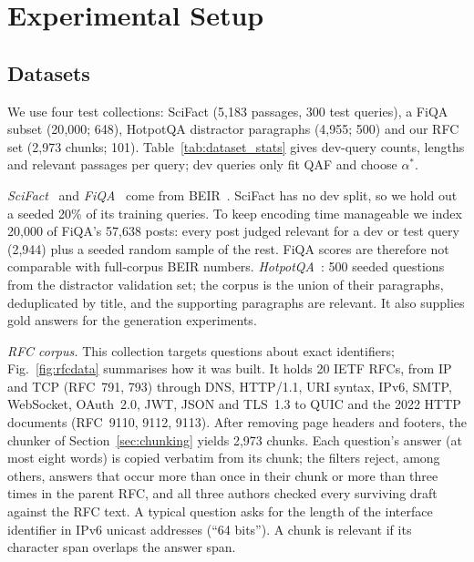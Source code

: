 \section{Experimental Setup}
\label{sec:setup}

\subsection{Datasets}
\label{sec:data}
We use four test collections: SciFact (5{,}183 passages, 300 test queries),
a FiQA subset (20{,}000; 648), HotpotQA distractor paragraphs (4{,}955; 500)
and our RFC set (2{,}973 chunks; 101). Table~\ref{tab:dataset_stats} gives
dev-query counts, lengths and relevant passages per query; dev queries only
fit QAF and choose $\alpha^{*}$.

\textit{SciFact}~\cite{wadden2020scifact} and \textit{FiQA}~\cite{maia2018fiqa}
come from BEIR~\cite{thakur2021beir}. SciFact has no dev split, so we hold out
a seeded 20\% of its training queries. To keep encoding time manageable we
index 20{,}000 of FiQA's 57{,}638 posts: every post judged relevant for a dev
or test query (2{,}944) plus a seeded random sample of the rest. FiQA scores
are therefore not comparable with full-corpus BEIR numbers.
\textit{HotpotQA}~\cite{yang2018hotpotqa}: 500 seeded questions from the
distractor validation set; the corpus is the union of their paragraphs,
deduplicated by title, and the supporting paragraphs are relevant. It also
supplies gold answers for the generation experiments.

\textit{RFC corpus.} This collection targets questions about exact
identifiers; Fig.~\ref{fig:rfcdata} summarises how it was built. It holds 20 IETF
RFCs, from IP and TCP (RFC~791, 793) through DNS, HTTP/1.1, URI syntax, IPv6,
SMTP, WebSocket, OAuth~2.0, JWT, JSON and TLS~1.3 to QUIC and the 2022 HTTP
documents (RFC~9110, 9112, 9113). After removing page headers and footers, the
chunker of Section~\ref{sec:chunking} yields 2{,}973 chunks. Each question's
answer (at most eight words) is copied verbatim from its chunk; the filters
reject, among others, answers that occur more than once in their chunk or more
than three times in the parent RFC, and all three authors checked every
surviving draft against the RFC text. A typical question asks for the length
of the interface identifier in IPv6 unicast addresses (``64 bits''). A chunk
is relevant if its character span overlaps the answer span.

